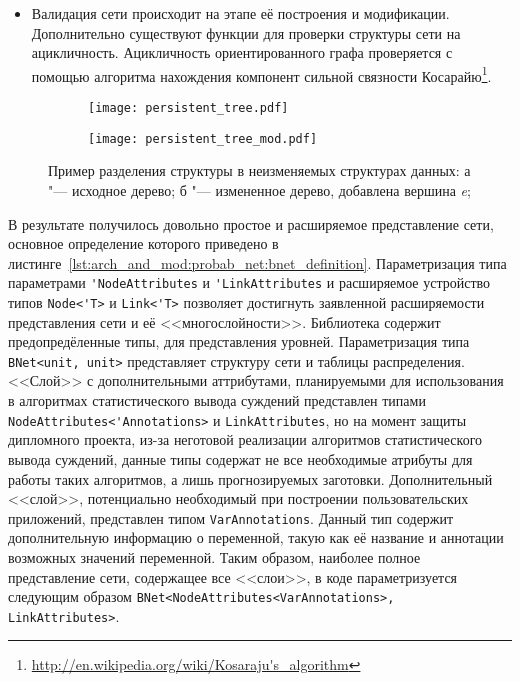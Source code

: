 \begin{itemize}
  \item Валидация сети происходит на этапе её построения и модификации.
  Дополнительно существуют функции для проверки структуры сети на ацикличность.
  Ацикличность ориентированного графа проверяется с помощью алгоритма нахождения компонент сильной связности Косарайю\footnote{\url{http://en.wikipedia.org/wiki/Kosaraju's_algorithm}}.

\end{itemize}

\begin{figure}[ht]
\centering
  \begin{subfigure}[b]{0.41\linewidth} 
    \centering
    \texttt{[image: persistent\_tree.pdf]}  
    \caption{}
  \end{subfigure}
  \begin{subfigure}[b]{0.58\linewidth} 
    \centering
    \texttt{[image: persistent\_tree\_mod.pdf]}  
    \caption{}
  \end{subfigure}
  \caption{ Пример разделения структуры в неизменяемых структурах данных: 
            а "--- исходное дерево;
            б "--- измененное дерево, добавлена вершина \textit{e};}
  \label{fig:arch_and_mod:probab_net:immutable_ds_modification}
\end{figure}

В результате получилось довольно простое и расширяемое представление сети, основное определение которого приведено в листинге~\ref{lst:arch_and_mod:probab_net:bnet_definition}.
Параметризация типа параметрами \lstinline!'NodeAttributes! и \lstinline!'LinkAttributes! и расширяемое устройство типов \lstinline!Node<'T>! и \lstinline!Link<'T>! позволяет достигнуть заявленной расширяемости представления сети и её <<многослойности>>.
Библиотека содержит предопредёленные типы, для представления уровней.
Параметризация типа \lstinline!BNet<unit, unit>! представляет структуру сети и таблицы распределения.
<<Слой>> с дополнительными аттрибутами, планируемыми для использования в алгоритмах статистического вывода суждений представлен типами \lstinline!NodeAttributes<'Annotations>! и \lstinline!LinkAttributes!, но на момент защиты дипломного проекта, из-за неготовой реализации алгоритмов статистического вывода суждений, данные типы содержат не все необходимые атрибуты для работы таких алгоритмов, а лишь прогнозируемых заготовки.
Дополнительный <<слой>>, потенциально необходимый при построении пользовательских приложений, представлен типом \lstinline!VarAnnotations!.
Данный тип содержит дополнительную информацию о переменной, такую как её название и аннотации возможных значений переменной.
Таким образом, наиболее полное представление сети, содержащее все <<слои>>, в коде параметризуется следующим образом \lstinline!BNet<NodeAttributes<VarAnnotations>, LinkAttributes>!.

